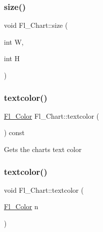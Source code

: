 \subsubsection{\texorpdfstring{size()}{size()}\hspace{0.1cm}{\footnotesize\ttfamily [2/2]}}
{\footnotesize\ttfamily void Fl\+\_\+\+Chart\+::size (\begin{DoxyParamCaption}\item[{int}]{W,  }\item[{int}]{H }\end{DoxyParamCaption})\hspace{0.3cm}{\ttfamily [inline]}}

\mbox{\label{class_fl___chart_a047a8ef3040ff85c6d022d92e0ef3746}} 
\subsubsection{\texorpdfstring{textcolor()}{textcolor()}\hspace{0.1cm}{\footnotesize\ttfamily [1/2]}}
{\footnotesize\ttfamily \hyperlink{_enumerations_8_h_a8b762953646f8abee866061f1af78a6a}{Fl\+\_\+\+Color} Fl\+\_\+\+Chart\+::textcolor (\begin{DoxyParamCaption}{ }\end{DoxyParamCaption}) const\hspace{0.3cm}{\ttfamily [inline]}}

Gets the chart\textquotesingle{}s text color \mbox{\label{class_fl___chart_adde0ae8bff3349ebfa50c7680a90f3b0}} 
\subsubsection{\texorpdfstring{textcolor()}{textcolor()}\hspace{0.1cm}{\footnotesize\ttfamily [2/2]}}
{\footnotesize\ttfamily void Fl\+\_\+\+Chart\+::textcolor (\begin{DoxyParamCaption}\item[{\hyperlink{_enumerations_8_h_a8b762953646f8abee866061f1af78a6a}{Fl\+\_\+\+Color}}]{n }\end{DoxyParamCaption})\hspace{0.3cm}{\ttfamily [inline]}}

